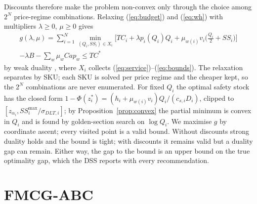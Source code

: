 \documentclass[preprint,12pt,authoryear]{elsarticle}
\newcommand{\sdlt}{\sigma_{DLT,i}}
\begin{document}
Discounts therefore make the problem non-convex only through the choice among $2^N$ price-regime combinations. Relaxing (\ref{eq:budget}) and (\ref{eq:wh}) with multipliers $\lambda\ge0$, $\mu\ge0$ gives
\begin{multline}\label{eq:dual}
g(\lambda,\mu)=\sum_{i=1}^N\min_{(Q_i,SS_i)\in X_i}\Big[TC_i+\lambda p_i(Q_i)Q_i+\mu_{w(i)}v_i\big(\tfrac{Q_i}{2}+SS_i\big)\Big]\\
-\lambda B-\sum_w\mu_wCap_w\le TC^*
\end{multline}
by weak duality \citep{Everett1963,Fisher1981}, where $X_i$ collects (\ref{eq:service})--(\ref{eq:bounds}). The relaxation separates by SKU; each SKU is solved per price regime and the cheaper kept, so the $2^N$ combinations are never enumerated. For fixed $Q_i$ the optimal safety stock has the closed form $1-\Phi(z_i^*)=(h_i+\mu_{w(i)}v_i)Q_i/(c_{s,i}D_i)$, clipped to $[z_{\alpha_i},SS^{\max}_i/\sdlt]$; by Proposition~\ref{prop:convex} the partial minimum is convex in $Q_i$ and is found by golden-section search on $\log Q_i$. We maximise $g$ by coordinate ascent; every visited point is a valid bound. Without discounts strong duality holds \citep{Boyd2004} and the bound is tight; with discounts it remains valid but a duality gap can remain. Either way, the gap to the bound is an upper bound on the true optimality gap, which the DSS reports with every recommendation.

\section{FMCG-ABC}\label{sec:abc}
\end{document}
